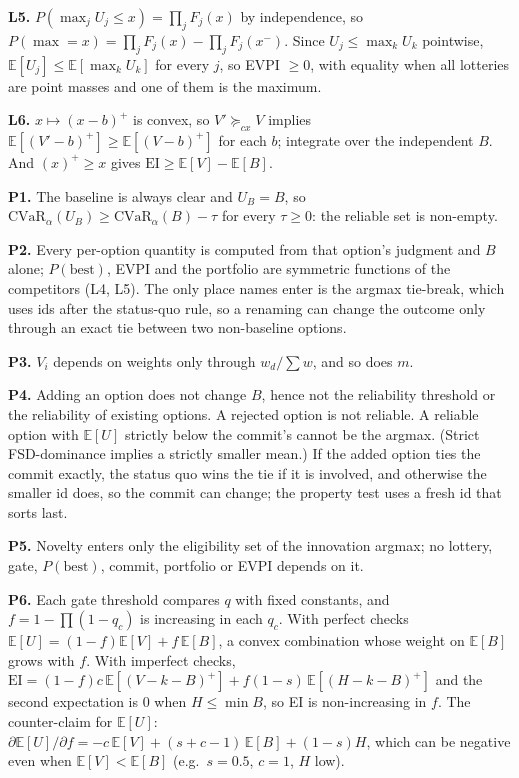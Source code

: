 \documentclass[11pt]{article}
\theoremstyle{definition}
\begin{document}
\textbf{L5.} $P(\max_jU_j\le x)=\prod_jF_j(x)$ by independence, so
$P(\max=x)=\prod_jF_j(x)-\prod_jF_j(x^-)$. Since $U_j\le\max_kU_k$ pointwise,
$\mathbb E[U_j]\le\mathbb E[\max_kU_k]$ for every $j$, so EVPI $\ge0$, with equality when all
lotteries are point masses and one of them is the maximum.

\textbf{L6.} $x\mapsto(x-b)^+$ is convex, so $V'\succeq_{cx}V$ implies
$\mathbb E[(V'-b)^+]\ge\mathbb E[(V-b)^+]$ for each $b$; integrate over the independent $B$. And
$(x)^+\ge x$ gives $\mathrm{EI}\ge\mathbb E[V]-\mathbb E[B]$.

\textbf{P1.} The baseline is always clear and $U_B=B$, so $\mathrm{CVaR}_\alpha(U_B)\ge
\mathrm{CVaR}_\alpha(B)-\tau$ for every $\tau\ge0$: the reliable set is non-empty.

\textbf{P2.} Every per-option quantity is computed from that option's judgment and $B$ alone;
$P(\mathrm{best})$, EVPI and the portfolio are symmetric functions of the competitors (L4, L5). The
only place names enter is the argmax tie-break, which uses ids after the status-quo rule, so a
renaming can change the outcome only through an exact tie between two non-baseline options.

\textbf{P3.} $V_i$ depends on weights only through $w_d/\sum w$, and so does $m$.

\textbf{P4.} Adding an option does not change $B$, hence not the reliability threshold or the
reliability of existing options. A rejected option is not reliable. A reliable option with
$\mathbb E[U]$ strictly below the commit's cannot be the argmax. (Strict FSD-dominance implies a
strictly smaller mean.) If the added option ties the commit exactly, the status quo wins the tie if
it is involved, and otherwise the smaller id does, so the commit can change; the property test uses
a fresh id that sorts last.

\textbf{P5.} Novelty enters only the eligibility set of the innovation argmax; no lottery, gate,
$P(\mathrm{best})$, commit, portfolio or EVPI depends on it.

\textbf{P6.} Each gate threshold compares $q$ with fixed constants, and $f=1-\prod(1-q_c)$ is
increasing in each $q_c$. With perfect checks $\mathbb E[U]=(1-f)\mathbb E[V]+f\,\mathbb E[B]$, a
convex combination whose weight on $\mathbb E[B]$ grows with $f$. With imperfect checks,
$\mathrm{EI}=(1-f)c\,\mathbb E[(V-k-B)^+]+f(1-s)\,\mathbb E[(H-k-B)^+]$ and the second expectation is
0 when $H\le\min B$, so EI is non-increasing in $f$. The counter-claim for $\mathbb E[U]$:
$\partial\mathbb E[U]/\partial f=-c\,\mathbb E[V]+(s+c-1)\,\mathbb E[B]+(1-s)H$, which can be negative
even when $\mathbb E[V]<\mathbb E[B]$ (e.g.\ $s=0.5$, $c=1$, $H$ low).
\end{document}
